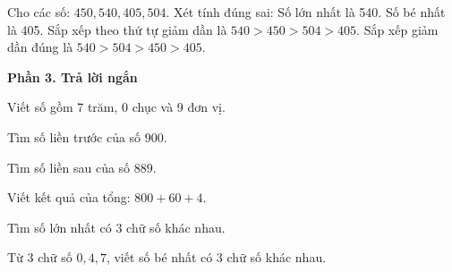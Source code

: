 \begin{ex} %
Cho các số: $450, 540, 405, 504$. Xét tính đúng sai:
\choiceTF
{\True Số lớn nhất là 540.}
{\True Số bé nhất là 405.}
{Sắp xếp theo thứ tự giảm dần là $540 > 450 > 504 > 405$.}
{\True Sắp xếp giảm dần đúng là $540 > 504 > 450 > 405$.}
\end{ex}

\textbf{Phần 3. Trả lời ngắn}

\begin{ex} %
Viết số gồm 7 trăm, 0 chục và 9 đơn vị.
\end{ex}

\begin{ex} %
Tìm số liền trước của số $900$.
\end{ex}

\begin{ex} %
Tìm số liền sau của số $889$.
\end{ex}

\begin{ex} %
Viết kết quả của tổng: $800 + 60 + 4$.
\end{ex}

\begin{ex} %
Tìm số lớn nhất có 3 chữ số khác nhau.
\end{ex}

\begin{ex} %
Từ 3 chữ số $0, 4, 7$, viết số bé nhất có 3 chữ số khác nhau.
\end{ex}
